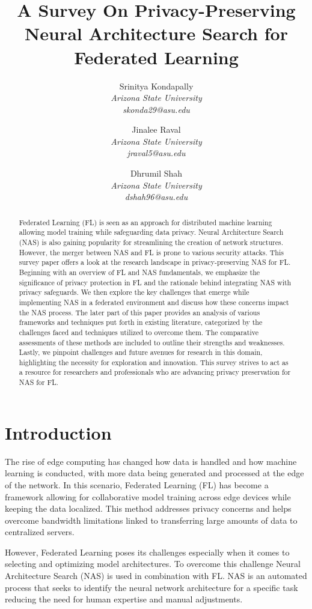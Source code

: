 \documentclass[conference]{IEEEtran}
\title{\LARGE A Survey On Privacy-Preserving Neural Architecture Search for Federated Learning}
\author{
    Srinitya Kondapally\\
    \textit{Arizona State University}\\
    \textit{skonda29@asu.edu}
    \and
    Jinalee Raval\\
    \textit{Arizona State University}\\
    \textit{jraval5@asu.edu}
    \and
    Dhrumil Shah\\
    \textit{Arizona State University}\\
    \textit{dshah96@asu.edu}
}
\begin{document}
\maketitle


\begin{abstract}
Federated Learning (FL) is seen as an approach for distributed machine learning allowing model training while safeguarding data privacy. Neural Architecture Search (NAS) is also gaining popularity for streamlining the creation of network structures. However, the merger between NAS and FL is prone to various security attacks. This survey paper offers a look at the research landscape in privacy-preserving NAS for FL. Beginning with an overview of FL and NAS fundamentals, we emphasize the significance of privacy protection in FL and the rationale behind integrating NAS with privacy safeguards. We then explore the key challenges that emerge while implementing NAS in a federated environment and discuss how these concerns impact the NAS process. The later part of this paper provides an analysis of various frameworks and techniques put forth in existing literature, categorized by the challenges faced and techniques utilized to overcome them. The comparative assessments of these methods are included to outline their strengths and weaknesses. Lastly, we pinpoint challenges and future avenues for research in this domain, highlighting the necessity for exploration and innovation. This survey strives to act as a resource for researchers and professionals who are advancing privacy preservation for NAS for FL.
\end{abstract}

\IEEEpeerreviewmaketitle



\section{Introduction}
The rise of edge computing has changed how data is handled and how machine learning is conducted, with more data being generated and processed at the edge of the network. In this scenario, Federated Learning (FL) has become a framework allowing for collaborative model training across edge devices while keeping the data localized. This method addresses privacy concerns and helps overcome bandwidth limitations linked to transferring large amounts of data to centralized servers.

However, Federated Learning poses its challenges especially when it comes to selecting and optimizing model architectures. To overcome this challenge Neural Architecture Search (NAS) is used in combination with FL. NAS is an automated process that seeks to identify the neural network architecture for a specific task reducing the need for human expertise and manual adjustments.
\end{document}
